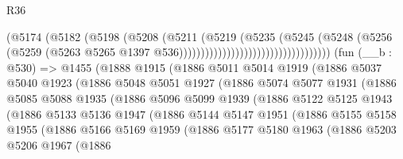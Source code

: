 \begin{lexlean}{R36}
\begin{coremodule}
                                                  (@5174
                                                    (@5182
                                                      (@5198
                                                        (@5208
                                                          (@5211
                                                            (@5219
                                                              (@5235
                                                                (@5245
                                                                  (@5248
                                                                    (@5256
                                                                      (@5259
                                                                        (@5263
                                                                          @5265
                                                                          @1397
                                                                          @536)))))))))))))))))))))))))))))))))))
    (fun (__b : @530) =>
    @1455
      (@1888
        @1915
        (@1886
          @5011
          @5014
          @1919
          (@1886
            @5037
            @5040
            @1923
            (@1886
              @5048
              @5051
              @1927
              (@1886
                @5074
                @5077
                @1931
                (@1886
                  @5085
                  @5088
                  @1935
                  (@1886
                    @5096
                    @5099
                    @1939
                    (@1886
                      @5122
                      @5125
                      @1943
                      (@1886
                        @5133
                        @5136
                        @1947
                        (@1886
                          @5144
                          @5147
                          @1951
                          (@1886
                            @5155
                            @5158
                            @1955
                            (@1886
                              @5166
                              @5169
                              @1959
                              (@1886
                                @5177
                                @5180
                                @1963
                                (@1886
                                  @5203
                                  @5206
                                  @1967
                                  (@1886

\end{coremodule}
\end{lexlean}
